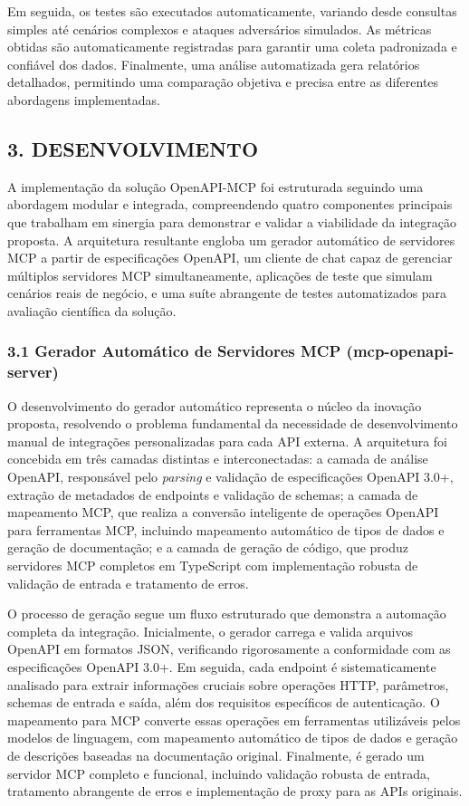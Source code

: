 \documentclass[
]{article}
\begin{document}
Em seguida, os testes são executados automaticamente, variando desde
consultas simples até cenários complexos e ataques adversários
simulados. As métricas obtidas são automaticamente registradas para
garantir uma coleta padronizada e confiável dos dados. Finalmente, uma
análise automatizada gera relatórios detalhados, permitindo uma
comparação objetiva e precisa entre as diferentes abordagens
implementadas.

\subsection{3. DESENVOLVIMENTO}\label{desenvolvimento}

A implementação da solução OpenAPI-MCP foi estruturada seguindo uma
abordagem modular e integrada, compreendendo quatro componentes
principais que trabalham em sinergia para demonstrar e validar a
viabilidade da integração proposta. A arquitetura resultante engloba um
gerador automático de servidores MCP a partir de especificações OpenAPI,
um cliente de chat capaz de gerenciar múltiplos servidores MCP
simultaneamente, aplicações de teste que simulam cenários reais de
negócio, e uma suíte abrangente de testes automatizados para avaliação
científica da solução.

\subsubsection{3.1 Gerador Automático de Servidores MCP
(mcp-openapi-server)}\label{gerador-automuxe1tico-de-servidores-mcp-mcp-openapi-server}

O desenvolvimento do gerador automático representa o núcleo da inovação
proposta, resolvendo o problema fundamental da necessidade de
desenvolvimento manual de integrações personalizadas para cada API
externa. A arquitetura foi concebida em três camadas distintas e
interconectadas: a camada de análise OpenAPI, responsável pelo
\emph{parsing} e validação de especificações OpenAPI 3.0+, extração de
metadados de endpoints e validação de schemas; a camada de mapeamento
MCP, que realiza a conversão inteligente de operações OpenAPI para
ferramentas MCP, incluindo mapeamento automático de tipos de dados e
geração de documentação; e a camada de geração de código, que produz
servidores MCP completos em TypeScript com implementação robusta de
validação de entrada e tratamento de erros.

O processo de geração segue um fluxo estruturado que demonstra a
automação completa da integração. Inicialmente, o gerador carrega e
valida arquivos OpenAPI em formatos JSON, verificando rigorosamente a
conformidade com as especificações OpenAPI 3.0+. Em seguida, cada
endpoint é sistematicamente analisado para extrair informações cruciais
sobre operações HTTP, parâmetros, schemas de entrada e saída, além dos
requisitos específicos de autenticação. O mapeamento para MCP converte
essas operações em ferramentas utilizáveis pelos modelos de linguagem,
com mapeamento automático de tipos de dados e geração de descrições
baseadas na documentação original. Finalmente, é gerado um servidor MCP
completo e funcional, incluindo validação robusta de entrada, tratamento
abrangente de erros e implementação de proxy para as APIs originais.
\end{document}
